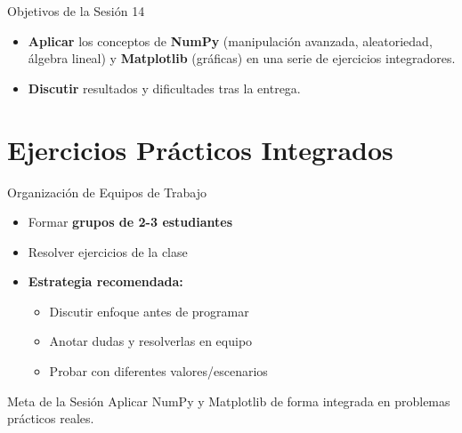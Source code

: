 \documentclass[10pt]{beamer}
\begin{document}
\begin{frame}{Objetivos de la Sesión 14}
  \begin{itemize}
    \item \textbf{Aplicar} los conceptos de \textbf{NumPy} (manipulación avanzada, aleatoriedad, álgebra lineal) y \textbf{Matplotlib} (gráficas) en una serie de ejercicios integradores.
    \item \textbf{Discutir} resultados y dificultades tras la entrega.
  \end{itemize}
\end{frame}


\section{Ejercicios Prácticos Integrados}

\begin{frame}{Organización de Equipos de Trabajo}
  \begin{itemize}
    \item Formar \textbf{grupos de 2-3 estudiantes}
    \item Resolver ejercicios de la clase 
    \item \textbf{Estrategia recomendada:}
      \begin{itemize}
        \item Discutir enfoque antes de programar
        \item Anotar dudas y resolverlas en equipo
        \item Probar con diferentes valores/escenarios
      \end{itemize}
  \end{itemize}
  
  \begin{block}{Meta de la Sesión}
    Aplicar NumPy y Matplotlib de forma integrada en problemas prácticos reales.
  \end{block}
\end{frame}
\end{document}
